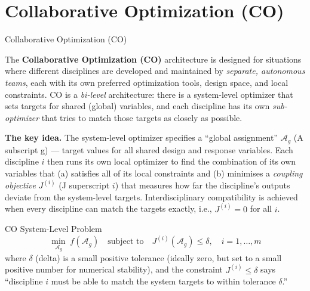 \documentclass[aspectratio=169,10pt]{beamer}
\begin{document}
\section{Collaborative Optimization (CO)}

\begin{frame}[allowframebreaks]{Collaborative Optimization (CO)}

  The \textbf{Collaborative Optimization (CO)} architecture is designed
  for situations where different disciplines are developed and maintained
  by \emph{separate, autonomous teams}, each with its own preferred
  optimization tools, design space, and local constraints.  CO is a
  \emph{bi-level} architecture: there is a system-level optimizer that
  sets targets for shared (global) variables, and each discipline has
  its own \emph{sub-optimizer} that tries to match those targets as
  closely as possible.

  \textbf{The key idea.}  The system-level optimizer specifies a
  ``global assignment'' $\mathcal{A}_g$ (A subscript g) --- target values
  for all shared design and response variables.  Each discipline $i$ then
  runs its own local optimizer to find the combination of its own variables
  that (a) satisfies all of its local constraints and (b) minimises a
  \emph{coupling objective} $J^{(i)}$ (J superscript $i$) that measures
  how far the discipline's outputs deviate from the system-level targets.
  Interdisciplinary compatibility is achieved when every discipline can
  match the targets exactly, i.e., $J^{(i)} = 0$ for all $i$.

  \begin{block}{CO System-Level Problem}
    \[
      \min_{\mathcal{A}_g}\; f(\mathcal{A}_g)
      \quad \text{subject to} \quad
      J^{(i)}(\mathcal{A}_g) \leq \delta, \quad i = 1, \ldots, m
    \]
    where $\delta$ (delta) is a small positive tolerance (ideally zero, but
    set to a small positive number for numerical stability), and the
    constraint $J^{(i)} \leq \delta$ says ``discipline $i$ must be able to
    match the system targets to within tolerance $\delta$.''
  \end{block}

  \framebreak


\end{frame}
\end{document}

